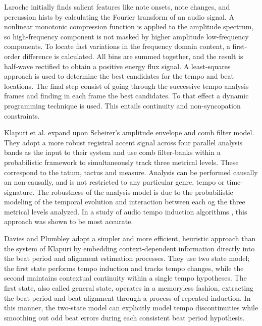 \documentclass{scrartcl}
\begin{document}

Laroche \cite{Laroche2003} initially finds salient features like note onsets, note changes, and percussion hists by calculating the Fourier transform of an audio signal. A nonlinear monotonic compression function is applied to the amplitude spectrum, so high-frequency component is not masked by higher amplitude low-frequency components. To locate fast variations in the frequency domain content, a first-order difference is calculated. All bins are summed together, and the result is half-wave rectified to obtain a positive energy flux signal. A least-squares approach is used to determine the best candidates for the tempo and beat locations. The final step consist of going through the successive tempo analysis frames and finding in each frame the best candidates. To that effect a dynamic programming technique is used. This entails continuity and non-syncopation constraints. 

Klapuri et al. \cite{Klapuri2005} expand upon Scheirer's amplitude envelope and comb filter model. They adopt a more robust registral accent signal across four parallel analysis bands as the input to their system and use comb filter-banks within a probabilistic framework to simultaneously track three metrical levels. These correspond to the tatum, tactus and measure. Analysis can be performed causally an non-causally, and is not restricted to any particular genre, tempo or time-signature. The robustness of the analysis model is due to the probabilistic modeling of the temporal evolution and interaction between each og the three metrical levels analyzed. In a study of audio tempo induction algorithms \cite{Gouyon2006b}, this approach was shown to be most accurate.

Davies and Plumbley \cite{Davies2007} adopt a simpler and more efficient, heuristic approach than the system of Klapuri by embedding context-dependent information directly into the beat period and alignment estimation processes. They use two state model; the first state performs tempo induction and tracks tempo changes, while the second maintains contextual continuity within a single tempo hypotheses. The first state, also called general state, operates in a memoryless fashion, extracting the beat period and beat alignment through a process of repeated induction. In this manner, the two-state model can explicitly model tempo discontinuities while smoothing out odd beat errors during each consistent beat period hypothesis. 
\end{document}
